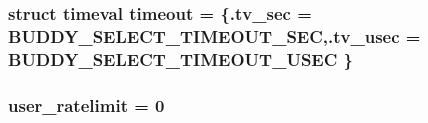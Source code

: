 \subsubsection[{timeout}]{\setlength{\rightskip}{0pt plus 5cm}struct {\bf timeval} {\bf timeout} = \{.tv\_\-sec = BUDDY\_\-SELECT\_\-TIMEOUT\_\-SEC,.tv\_\-usec = BUDDY\_\-SELECT\_\-TIMEOUT\_\-USEC \}\hspace{0.3cm}{\ttfamily  [static]}}\label{buddy_8c_a03a5df464f7f59f8fe9f8da62642ce06}
\subsubsection[{user\_\-ratelimit}]{ {\bf user\_\-ratelimit} = 0}\label{buddy_8c_ae27137b4c4b5c8be0a91356bfab19ee1}
